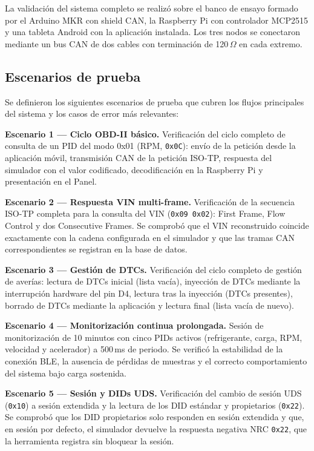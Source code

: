 La validación del sistema completo se realizó sobre el banco de ensayo formado por el Arduino MKR con shield CAN, la Raspberry Pi con controlador MCP2515 y una tableta Android con la aplicación instalada. Los tres nodos se conectaron mediante un bus CAN de dos cables con terminación de 120\,$\Omega$ en cada extremo.

\subsection{Escenarios de prueba}

Se definieron los siguientes escenarios de prueba que cubren los flujos principales del sistema y los casos de error más relevantes:

\textbf{Escenario 1 — Ciclo OBD-II básico.} Verificación del ciclo completo de consulta de un PID del modo 0x01 (RPM, \texttt{0x0C}): envío de la petición desde la aplicación móvil, transmisión CAN de la petición ISO-TP, respuesta del simulador con el valor codificado, decodificación en la Raspberry Pi y presentación en el Panel.

\textbf{Escenario 2 — Respuesta VIN multi-frame.} Verificación de la secuencia ISO-TP completa para la consulta del VIN (\texttt{0x09 0x02}): First Frame, Flow Control y dos Consecutive Frames. Se comprobó que el VIN reconstruido coincide exactamente con la cadena configurada en el simulador y que las tramas CAN correspondientes se registran en la base de datos.

\textbf{Escenario 3 — Gestión de DTCs.} Verificación del ciclo completo de gestión de averías: lectura de DTCs inicial (lista vacía), inyección de DTCs mediante la interrupción hardware del pin D4, lectura tras la inyección (DTCs presentes), borrado de DTCs mediante la aplicación y lectura final (lista vacía de nuevo).

\textbf{Escenario 4 — Monitorización continua prolongada.} Sesión de monitorización de 10 minutos con cinco PIDs activos (refrigerante, carga, RPM, velocidad y acelerador) a 500\,ms de periodo. Se verificó la estabilidad de la conexión BLE, la ausencia de pérdidas de muestras y el correcto comportamiento del sistema bajo carga sostenida.

\textbf{Escenario 5 — Sesión y DIDs UDS.} Verificación del cambio de sesión UDS (\texttt{0x10}) a sesión extendida y la lectura de los DID estándar y propietarios (\texttt{0x22}). Se comprobó que los DID propietarios solo responden en sesión extendida y que, en sesión por defecto, el simulador devuelve la respuesta negativa NRC \texttt{0x22}, que la herramienta registra sin bloquear la sesión.

